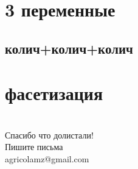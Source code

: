 \section{3 переменные}
\subsection{колич+колич+колич}

\section{фасетизация}
\section{}
\begin{frame}
{\huge Спасибо что долистали!\bigskip\\
\normalsize Пишите письма\\
agricolamz@gmail.com
\vspace{-130pt}}
\end{frame}
